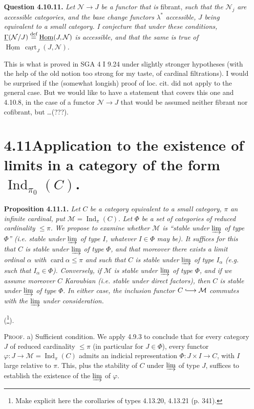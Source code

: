 \documentclass[11pt]{article}
\newcommand{\printedpage}[1]{\marginpar{\footnotesize p.~#1}}
\newcommand{\msp}[1]{\marginpar{\footnotesize [#1]}}
\newcommand{\defeq}{\overset{\text{\upshape def}}{=}}
\newcommand{\Hom}{\underline{\operatorname{Hom}}}
\newcommand{\uGamma}{\underline{\Gamma}}
\newcommand{\Ind}{\operatorname{Ind}}
\newcommand{\into}{\lhook\joinrel\longrightarrow}
\begin{document}
\textbf{Question 4.10.11.} \textit{Let $\mathcal{N} \longrightarrow J$ be a functor that is} fibrant, \textit{such that the $\mathcal{N}_j$ are accessible categories, and the base change functors $\lambda^*$ accessible, $J$ being equivalent to a small category. I} \msp{page 267} \textit{conjecture that under these conditions, $\uGamma(\mathcal{N}/J) \defeq \Hom(J,\mathcal{N})$ is accessible, and that the same is true of $\Hom\,\underline{\operatorname{cart}}_J(J,\mathcal{N})$.}

This is what is proved in SGA 4 I 9.24 under slightly stronger hypotheses (with the help of the old notion too strong for my taste, of cardinal filtrations). I would be surprised if the (somewhat longish) proof of loc. cit. did not apply to the general case. But we would like to have a statement that covers this one and 4.10.8, in the case of a functor $\mathcal{N} \longrightarrow J$ that would be assumed neither fibrant nor cofibrant, but \ldots(???).

\section*{4.11\quad Application to the existence of limits in a category of the form $\Ind_{\pi_0}(C)$.}

\textbf{Proposition 4.11.1.} \textit{Let} \msp{page 268} \textit{$C$ be a category equivalent to a small category, $\pi$ an infinite cardinal, put $\mathcal{M} = \Ind_\pi(C)$. Let $\Phi$ be a set of categories of reduced cardinality $\leqslant \pi$. We propose to examine whether $\mathcal{M}$ is ``stable under $\varinjlim$ of type $\Phi$'' (i.e. stable under $\varinjlim$ of type $I$, whatever $I \in \Phi$ may be). It suffices for this that $C$ is stable under $\varinjlim$ of type $\Phi$, and that moreover there exists a limit ordinal $\alpha$ with $\operatorname{card}\alpha \leqslant \pi$ and such that $C$ is stable under $\varinjlim$ of type $I_\alpha$ (e.g. such that $I_\alpha \in \Phi$). Conversely, if $\mathcal{M}$ is stable under $\varinjlim$ of type $\Phi$, and if we assume moreover $C$ Karoubian (i.e. stable under direct factors), then $C$ is stable under $\varinjlim$ of type $\Phi$. In either case, the inclusion functor $C \into \mathcal{M}$ commutes with the $\varinjlim$ under consideration.}

(\footnote{Make explicit here the corollaries of types 4.13.20, 4.13.21 (p. 341).}).

\textsc{Proof}. a) Sufficient condition. We apply 4.9.3 to conclude that
\printedpage{101}
\msp{page 269}
for every category $J$ of reduced cardinality $\leqslant \pi$ (in particular for $J \in \Phi$), every functor $\varphi : J \longrightarrow \mathcal{M} = \Ind_\pi(C)$ admits an indicial representation $\Phi : J \times I \longrightarrow C$, with $I$ large relative to $\pi$. This, plus the stability of $C$ under $\varinjlim$ of type $J$, suffices to establish the existence of the $\varinjlim$ of $\varphi$.
\end{document}
